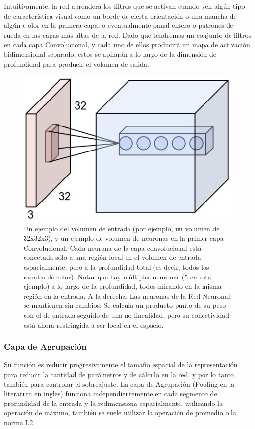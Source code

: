 \documentclass[a4paper,11pt,spanish]{book}
\begin{document}
	Intuitivamente, la red aprenderá los filtros que se activan cuando ven algún tipo de característica visual como un borde de cierta orientación o una mancha de algún c
	olor en la primera capa, o eventualmente panal entero o patrones de rueda en las capas más altas de la red. 
	Dado que tendremos un conjunto de filtros en cada capa Convolucional, y cada uno de ellos producirá un mapa de activación bidimensional separado, estos se apilarán 
	a lo largo de la dimensión de profundidad para producir el volumen de salida.

	\begin{figure}[H]
	  \begin{center}
	   \includegraphics[width=0.8\linewidth]{./img/stanford_conv_layer.jpeg}
	  \end{center}
	  \caption{Un ejemplo del volumen de entrada (por ejemplo, un volumen de 32x32x3), y un ejemplo de volumen de neuronas en la primer capa Convolucional.
	    Cada neurona de la capa convolucional está conectada sólo a una región local en el volumen de entrada espacialmente, pero a la profundidad total (es decir, todos
	    los canales de color). Notar que hay múltiples neuronas (5 en este ejemplo) a lo largo de la profundidad, todos mirando en la misma región en la entrada.
	    A la derecha: Las neuronas de la Red Neuronal se mantienen sin cambios: Se calcula un producto punto de su peso con el de entrada seguido de una no-linealidad,
	    pero su conectividad está ahora restringida a ser local en el espacio. \cite{Karpathy:Stanford}}
	  \label{fig:conv_layer}
	\end{figure}

      \subsubsection{Capa de Agrupación}
	Su función es reducir progresivamente el tamaño espacial de la representación para reducir la cantidad de parámetros y de cálculo en la red, y por lo tanto también para controlar
	el sobreajuste. La capa de Agrupación (Pooling en la literatura en ingles) funciona independientemente en cada segmento de profundidad de la entrada y la redimensiona espacialmente, utilizando la operación de máximo,
	también se suele utilizar la operación de promedio o la norma L2.
\end{document}
